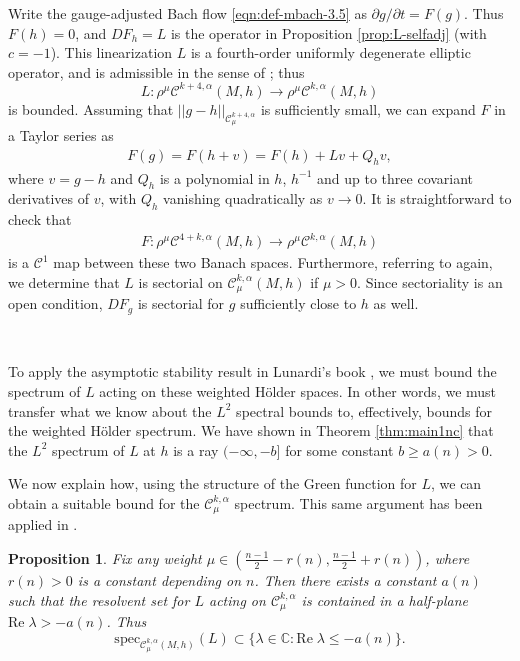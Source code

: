 \documentclass[10pt,reqno]{amsart}
\newtheorem{prop}[theorem]{Proposition}
\begin{document}
Write the gauge-adjusted Bach flow \eqref{eqn:def-mbach-3.5} as $\partial g/\partial t = F(g)$. Thus $F(h) = 0$, and $DF_h = L$ is
the operator in Proposition \ref{prop:L-selfadj} (with $c=-1$).  This linearization $L$ is a fourth-order uniformly degenerate elliptic operator, and
is admissible in the sense of \cite[Definition 2.0]{BGIM2}; thus 
\[
L: \rho^{\mu} \mathcal C^{k+4,\alpha}(M,h) \longrightarrow \rho^{\mu} \mathcal C^{k,\alpha}(M,h)
\]
is bounded.  Assuming that $||g-h||_{\mathcal C^{k+4,\alpha}_\mu}$ is sufficiently small, we can expand $F$ in a Taylor series as 
\begin{align*}
F( g ) = F( h + v ) = F(h) + L v + Q_h v,
\end{align*}
where $v = g-h$ and $Q_h$ is a polynomial in $h$, $h^{-1}$ and up to three covariant derivatives of $v$, with $Q_h$ vanishing quadratically as $v \to 0$.  
It is straightforward to check that 
\begin{align*}
F: \rho^{\mu} \mathcal C^{4+k,\alpha}(M,h) \longrightarrow \rho^{\mu} \mathcal C^{k,\alpha}(M,h)
\end{align*}
is a $\mathcal C^1$ map between these two Banach spaces.   Furthermore, referring to \cite{BGIM2} again, we determine that $L$ is sectorial on $\mathcal C^{k,\alpha}_{\mu}(M,h)$
if $\mu > 0$. Since sectoriality is an open condition, $DF_g$ is sectorial for $g$ sufficiently close to $h$ as well. 

\

To apply the asymptotic stability result in Lunardi's book \cite{Lunardi}, we must bound the spectrum of $L$ acting on these weighted H\"older spaces.  In other words,
we must transfer what we know about the $L^2$ spectral bounds to, effectively, bounds for the weighted H\"older spectrum. 
We have shown in Theorem \ref{thm:main1nc} that the $L^2$ spectrum of $L$ at $h$ is a ray $(-\infty, -b]$ for some constant $b \geq a(n) > 0$. 

We now explain how, using the structure of the Green function for $L$, we can obtain a suitable bound for the $\mathcal C^{k,\alpha}_\mu$ spectrum. 
This same argument has been applied in \cite{BGIM2}. 

\renewcommand{\Re}{\mathrm{Re} \; }

\begin{prop}
\label{prop:bdresolvent}
Fix any weight $\mu \in (\frac{n-1}{2}-r(n),\frac{n-1}{2}+r(n))$, where $r(n)>0$ is a constant depending on $n$.  Then there exists a constant $a(n)$ such that the resolvent set for $L$ acting on $\mathcal C^{k,\alpha}_\mu$
is contained in a half-plane $\Re \lambda > -a(n)$. Thus 
\[ 
\mathrm{spec}_{\mathcal C^{k,\alpha}_\mu(M, h)}(L) \subset \{\lambda \in \mathbb C: \Re \lambda \leq -a(n) \}.
\]
\end{prop}
\end{document}
